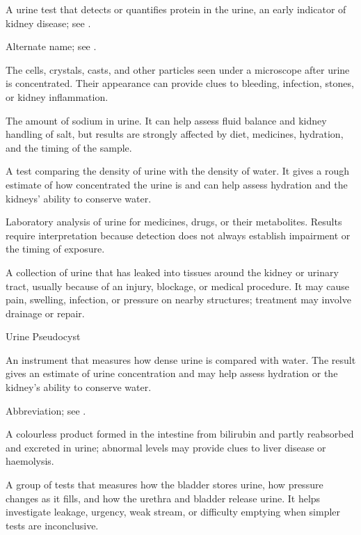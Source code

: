  A urine test that detects or quantifies protein in the urine, an early indicator of kidney disease; see .

 Alternate name; see .

 The cells, crystals, casts, and other particles seen under a microscope after urine is concentrated. Their appearance can provide clues to bleeding, infection, stones, or kidney inflammation.

 The amount of sodium in urine. It can help assess fluid balance and kidney handling of salt, but results are strongly affected by diet, medicines, hydration, and the timing of the sample.

 A test comparing the density of urine with the density of water. It gives a rough estimate of how concentrated the urine is and can help assess hydration and the kidneys’ ability to conserve water.

 Laboratory analysis of urine for medicines, drugs, or their metabolites. Results require interpretation because detection does not
always establish impairment or the timing of exposure.

 A collection of urine that has leaked into tissues around the kidney or urinary tract, usually because of an injury, blockage, or medical procedure. It may cause pain, swelling, infection, or pressure on nearby structures; treatment may involve drainage or repair.

\synonyms
Urine Pseudocyst

 An instrument that measures how dense urine is compared with water. The result gives an estimate of urine concentration and may help assess hydration or the kidney’s ability to conserve water.

 Abbreviation; see .

 A colourless product formed in the intestine from bilirubin and partly reabsorbed and excreted in urine; abnormal levels may provide clues to liver disease or haemolysis.

 A group of tests that measures how the bladder stores urine, how pressure changes as it fills, and how the urethra and bladder release urine. It helps investigate leakage, urgency, weak stream, or difficulty emptying when simpler tests are inconclusive.

